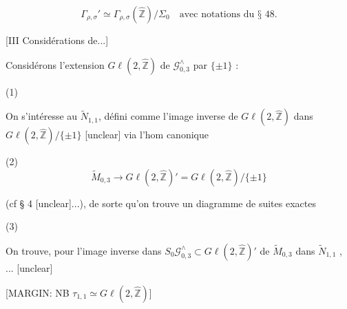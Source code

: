 \begin{enumerate}
$$ \Gamma_{\rho,\sigma}' \simeq \Gamma_{\rho,\sigma}(\hat{\mathbb{Z}})/\Sigma_0 \quad \text{avec notations du § 48.} $$

\newpage



\newpage


[III Considérations de...]

Considérons l'extension $G\ell(2, \hat{\mathbb{Z}})$ de $\mathcal{G}_{0,3}^\wedge$ par $\{\pm 1\}$ :

(1)

On s'intéresse au $\tilde{N}_{1,1}$, défini comme l'image inverse de $G\ell(2, \hat{\mathbb{Z}})$ dans $G\ell(2, \hat{\mathbb{Z}})/\{\pm 1\}$ [unclear] via l'hom canonique

(2)
$$ \tilde{M}_{0,3} \longrightarrow G\ell(2, \hat{\mathbb{Z}})' = G\ell(2, \hat{\mathbb{Z}})/\{\pm 1\} $$

(cf § 4 [unclear]...), de sorte qu'on trouve un diagramme de suites exactes

(3)

On trouve, pour l'image inverse dans $S_0 \mathcal{G}_{0,3}^\wedge \subset G\ell(2, \hat{\mathbb{Z}})'$ de $\tilde{M}_{0,3}$ dans $\tilde{N}_{1,1}$ , ... [unclear]

[MARGIN: NB $\tau_{1,1} \simeq G\ell(2, \hat{\mathbb{Z}})$]

\newpage


\end{enumerate}
